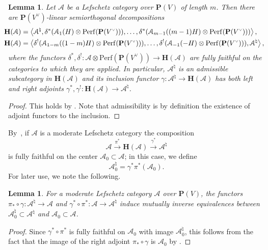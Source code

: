 \documentclass[11pt, reqno]{amsart}
\numberwithin{equation}{section}
\theoremstyle{plain}
\newtheorem{lemma}[theorem]{Lemma}
\theoremstyle{definition}
\newcommand{\Perf}{\mathrm{Perf}}
\newcommand{\hpd}{{\natural}}
\newcommand{\svee}{\scriptscriptstyle\vee}
\newcommand{\cAd}{\cA^\hpd}
\newcommand{\llangle}{\left \langle}
\newcommand{\rrangle}{\right \rangle}
\newcommand{\sotimes}{\otimes}
\newcommand{\vV}{V^{\svee}}
\newcommand{\cA}{\mathcal{A}}
\newcommand{\bH}{\mathbf{H}}
\newcommand{\bP}{\mathbf{P}}
\begin{document}
\begin{lemma}
\label{lemma:hpd-sod}
Let $\cA$ be a Lefschetz category over $\bP(V)$ of length $m$. 
Then there are $\bP(\vV)$-linear semiorthogonal decompositions 
\begin{align} 
\label{HC-sod}
\hspace{-.64em}
\bH(\cA) & = \llangle \cAd, 
\delta^*(\cA_1(H) \sotimes \Perf(\bP(\vV))), 
\dots, 
\delta^*(\cA_{m-1}((m-1)H) \sotimes \Perf(\bP(\vV))) \rrangle , \\ 
\label{HC-sod-left}
\hspace{-.64em}
\bH(\cA) & = \llangle 
\delta^!(\cA_{1-m}((1-m)H) \sotimes \Perf(\bP(\vV))), 
\dots, 
\delta^!(\cA_{-1}(-H) \sotimes \Perf(\bP(\vV))),
\cAd
\rrangle, 
\end{align}
where the functors $\delta^*, \delta^! \colon \cA \sotimes \Perf(\bP(\vV)) \to \bH(\cA)$ are fully faithful 
on the categories to which they are applied. 
In particular, $\cAd$ is an admissible subcategory in $\bH(\cA)$ 
and its inclusion functor \mbox{$\gamma \colon \cAd \to \bH(\cA)$} has both left and right adjoints 
$\gamma^*,\gamma^! \colon \bH(\cA) \to \cAd$. 
\end{lemma}

\begin{proof}
This holds by \cite[Definition 7.1 and Lemma 7.2]{NCHPD}. 
Note that admissibility is by definition the existence of adjoint functors to the inclusion. 
\end{proof} 

By~\cite[Lemma 7.3]{NCHPD}, if $\cA$ is a moderate Lefschetz category the composition 
\begin{equation*}
\cA \xrightarrow{\, \pi^* \,} \bH(\cA) \xrightarrow{\, \gamma^* \,} \cAd 
\end{equation*}
is fully faithful on the center $\cA_0 \subset \cA$; in this case, we define
\begin{equation}
\label{Ad0}
\cAd_0 = \gamma^*\pi^*(\cA_0). 
\end{equation} 
For later use, we note the following.

\begin{lemma}
\label{lemma-A0-Ad0-equivalence} 
For a moderate Lefschetz category $\cA$ over $\bP(V)$, 
the functors $\pi_* \circ \gamma \colon \cAd \to \cA$ 
and $\gamma^* \circ \pi^* \colon \cA \to \cAd$ induce mutually inverse 
equivalences between 
$\cAd_0 \subset \cAd$ and $\cA_0 \subset \cA$. 
\end{lemma} 

\begin{proof}
Since $\gamma^* \circ \pi^*$ is fully faithful on $\cA_0$ with image $\cAd_0$, 
this follows from the fact that the image of the right adjoint $\pi_* \circ \gamma$ is $\cA_0$ by \cite[Lemma~7.11]{NCHPD}. 
\end{proof}
\end{document}
